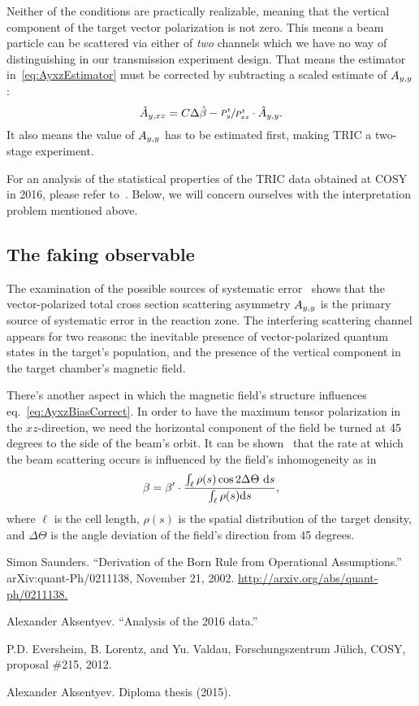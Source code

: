 \documentclass{article}
\begin{document}
Neither of the conditions are practically realizable, meaning that the vertical component of the target vector polarization is not zero. This means a beam particle can be scattered via either of \emph{two} channels which we have no way of distinguishing in our transmission experiment design. That means the estimator in~\eqref{eq:AyxzEstimator} must be corrected by subtracting a scaled estimate of $\Ayy$: 
\begin{equation}\label{eq:AyxzBiasCorrect}
\Ayxz* = C\Delta\slp* - \sfrac{P^t_y}{P^t_{xz}}\cdot\Ayy*.
\end{equation}
It also means the value of $\Ayy$ has to be estimated first, making TRIC a two-stage experiment.

For an analysis of the statistical properties of the TRIC data obtained at COSY in 2016, please refer to~\cite{DAnaRep}. Below, we will concern ourselves with the interpretation problem mentioned above.

\subsection{The faking observable}

The examination of the possible sources of systematic error~\cite{Proposal} shows that the vector-polarized total cross section scattering asymmetry $\Ayy$ is the primary source of systematic error in the reaction zone. The interfering scattering channel appears for two reasons: the inevitable presence of vector-polarized quantum states in the target's population, and the presence of the vertical component in the target chamber's magnetic field. 

There's another aspect in which the magnetic field's structure influences eq.~\eqref{eq:AyxzBiasCorrect}. In order to have the maximum tensor polarization in the $xz$-direction, we need the horizontal component of the field be turned at 45 degrees to the side of the beam's orbit. It can be shown~\cite{Diploma} that the rate at which the beam scattering occurs is influenced by the field's inhomogeneity as in
\newcommand{\Lcell}{\ell}
\[
	\slp = \slp'\cdot \frac{\int_{\Lcell}\rho(s)\cos2\Delta\Theta~\td s}{\int_{\Lcell}\rho(s)\td s},
\]
where $\Lcell$ is the cell length, $\rho(s)$ is the spatial distribution of the target density, and $\Delta\Theta$ is the angle deviation of the field's direction from 45 degrees. 



\begin{thebibliography}{9}
	Simon Saunders. ``Derivation of the Born Rule from Operational Assumptions.'' arXiv:quant-Ph/0211138, November 21, 2002. \url{http://arxiv.org/abs/quant-ph/0211138.}
	
	Alexander Aksentyev. ``Analysis of the 2016 data.''
	
	P.D. Eversheim, B. Lorentz, and Yu. Valdau, Forschungszentrum J\"ulich, COSY, proposal \#215, 2012.
	
	Alexander Aksentyev. Diploma thesis (2015).
\end{thebibliography}
\end{document}
